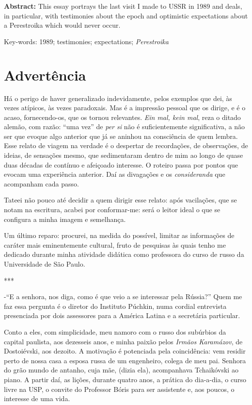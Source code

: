 \textbf{Abstract:} This essay portrays the last visit I made to USSR in
1989 and deals, in particular, with testimonies about the epoch and
optimistic expectations about a Perestroika which would never occur.

Key-words: 1989; testimonies; expectations; \emph{Perestroika}

\section{Advertência}

Há o perigo de haver generalizado indevidamente, pelos exemplos que dei,
às vezes atípicos, às vezes paradoxais. Mas é a impressão pessoal que os
dirige, e é o acaso, fornecendo-os, que os tornou relevantes. \emph{Ein
mal, kein mal}, reza o ditado alemão, com razão: ``uma vez'' de
\emph{per si} não é suficientemente significativa, a não ser que evoque
algo anterior que já se aninhou na consciência de quem lembra. Esse
relato de viagem na verdade é o despertar de recordações, de
observações, de ideias, de sensações mesmo, que sedimentaram dentro de
mim ao longo de quase duas décadas de contínuo e afeiçoado interesse. O
roteiro passa por pontos que evocam uma experiência anterior. Daí as
divagações e os \emph{consideranda} que acompanham cada passo.

Tateei não pouco até decidir a quem dirigir esse relato: após
vacilações, que se notam na escritura, acabei por conformar-me: será o
leitor ideal o que se configura a minha imagem e semelhança.

Um último reparo: procurei, na medida do possível, limitar as
informações de caráter mais eminentemente cultural, fruto de pesquisas
às quais tenho me dedicado durante minha atividade didática como
professora do curso de russo da Universidade de São Paulo.

***

-``E a senhora, nos diga, como é que veio a se interessar pela Rússia?''
Quem me faz essa pergunta é o diretor do Instituto Púchkin, numa cordial
entrevista presenciada por dois assessores para a América Latina e a
secretária particular.

Conto a eles, com simplicidade, meu namoro com o russo dos subúrbios da
capital paulista, aos dezesseis anos, e minha paixão pelos \emph{Irmãos
Karamázov}, de Dostoiévski, aos dezoito. A motivação é potenciada pela
coincidência: vem residir perto de nossa casa a esposa russa de um
engenheiro, colega de meu pai. Senhora do grão mundo de antanho, cuja
mãe, (dizia ela), acompanhava Tchaikóvski ao piano. A partir daí, as
lições, durante quatro anos, a prática do dia-a-dia, o curso livre na
USP, o convite do Professor Bóris para ser assistente e, aos poucos, o
interesse de uma vida.

